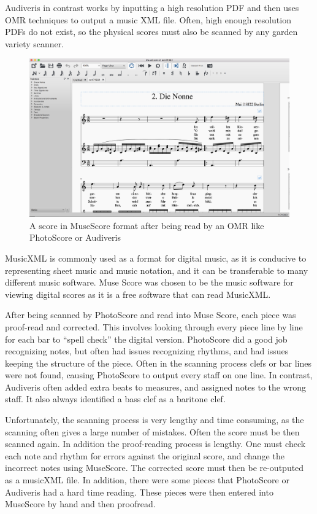 \documentclass[12pt,twoside]{reedthesis}
\theoremstyle{definition}
\theoremstyle{definition}
\theoremstyle{definition}
\theoremstyle{remark}
\begin{document}
Audiveris in contrast works by inputting a high resolution PDF and then
uses OMR techniques to output a music XML file. Often, high enough
resolution PDFs do not exist, so the physical scores must also be
scanned by any garden variety scanner.
\begin{figure}[h]
\centering
\includegraphics[scale=.30]{images/museScore.png}
\caption{A score in MuseScore format after being read by an OMR like PhotoScore or Audiveris}
\label{subd}
\end{figure}
MusicXML is commonly used as a format for digital music, as it is
conducive to representing sheet music and music notation, and it can be
transferable to many different music software. Muse Score was chosen to
be the music software for viewing digital scores as it is a free
software that can read MusicXML.

After being scanned by PhotoScore and read into Muse Score, each piece
was proof-read and corrected. This involves looking through every piece
line by line for each bar to ``spell check'' the digital version.
PhotoScore did a good job recognizing notes, but often had issues
recognizing rhythms, and had issues keeping the structure of the piece.
Often in the scanning process clefs or bar lines were not found, causing
PhotoScore to output every staff on one line. In contrast, Audiveris
often added extra beats to measures, and assigned notes to the wrong
staff. It also always identified a bass clef as a baritone clef.

Unfortunately, the scanning process is very lengthy and time consuming,
as the scanning often gives a large number of mistakes. Often the score
must be then scanned again. In addition the proof-reading process is
lengthy. One must check each note and rhythm for errors against the
original score, and change the incorrect notes using MuseScore. The
corrected score must then be re-outputed as a musicXML file. In
addition, there were some pieces that PhotoScore or Audiveris had a hard
time reading. These pieces were then entered into MuseScore by hand and
then proofread.
\end{document}
